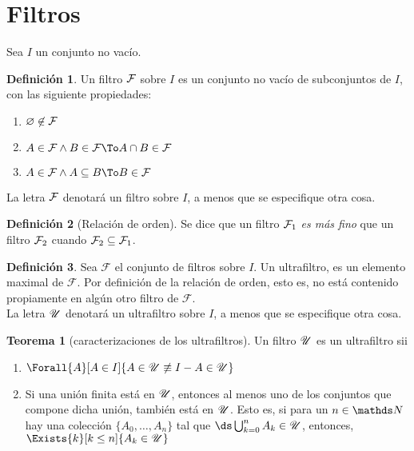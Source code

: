 \documentclass{article}
\theoremstyle{definition}
\newtheorem{definition}{Definición}[section]
\newtheorem{theorem}{Teorema}[section]
\theoremstyle{theorem*}
\begin{document}
\tableofcontents
\clearpage
\section{Filtros}

Sea $I$ un conjunto no vacío.
\begin{definition}
  Un filtro $\mathcal{F}$ sobre $I$ es un conjunto no
  vacío de subconjuntos de $I$, con las siguiente propiedades:
  \begin{enumerate}
    \item $\varnothing \not\in \mathcal{F}$
    \item $A \in \F \land B \in \F \To A\cap B \in \F$
    \item $A \in \F \land A \subseteq B \To B \in \F$
  \end{enumerate}
  La letra $\mathcal{F}$ denotará un filtro sobre $I$, a menos que se especifique
  otra cosa.
\end{definition}

\begin{definition}[Relación de orden] Se dice que
  un filtro $\mathcal{F}_1$ \emph{es más fino} que un filtro $\mathcal{F}_2$ cuando
  $\mathcal{F}_2 \subseteq \mathcal{F}_1$.
\end{definition}

\begin{definition}
  Sea $\mathscr{F}$ el conjunto de filtros sobre $I$. 
  Un ultrafiltro, es un elemento maximal de $\mathscr{F}$. Por definición
  de la relación de orden, esto es, no está contenido propiamente en algún
  otro filtro de $\mathscr{F}$.\\
  La letra $\mathscr{U}$ denotará un ultrafiltro sobre $I$, a menos que se especifique
  otra cosa.
\end{definition}

\begin{theorem}[caracterizaciones de los ultrafiltros]
  Un filtro $\mathscr{U}$ es un ultrafiltro sii
  \begin{enumerate}
    \item $\Forall{A}[A \in I]{A \in \U \not\equiv I - A \in \U}$
    \item Si una unión finita está en $\mathscr{U}$, entonces al menos uno de
          los conjuntos que compone dicha unión, también está en $\mathscr{U}$.
          Esto es, si para un $n\in\N$ hay una colección $\{A_0,\dots,A_n\}$
          tal que $\ds\bigcup_{k=0}^n A_k \in \U$, entonces,
          $\Exists{k}[k\leq n]{A_k \in \U}$
  \end{enumerate}
\end{theorem}
\end{document}
